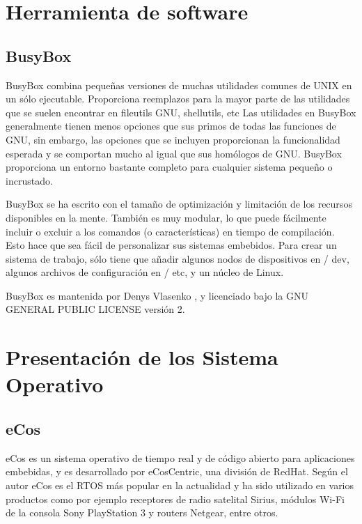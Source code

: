 	\section{Herramienta de software }	
 	
			\subsection{BusyBox}	
			 
BusyBox combina pequeñas versiones de muchas utilidades comunes de UNIX en un sólo ejecutable. Proporciona reemplazos para la mayor parte de las utilidades que se suelen encontrar en fileutils GNU, shellutils, etc Las utilidades en BusyBox generalmente tienen menos opciones que sus primos de todas las funciones de GNU, sin embargo, las opciones que se incluyen proporcionan la funcionalidad esperada y se comportan mucho al igual que sus homólogos de GNU. BusyBox proporciona un entorno bastante completo para cualquier sistema pequeño o incrustado.

BusyBox se ha escrito con el tamaño de optimización y limitación de los recursos disponibles en la mente. También es muy modular, lo que puede fácilmente incluir o excluir a los comandos (o características) en tiempo de compilación. Esto hace que sea fácil de personalizar sus sistemas embebidos. Para crear un sistema de trabajo, sólo tiene que añadir algunos nodos de dispositivos en / dev, algunos archivos de configuración en / etc, y un núcleo de Linux.

BusyBox es mantenida por Denys Vlasenko , y licenciado bajo la GNU GENERAL PUBLIC LICENSE versión 2.

		\section{Presentación de los Sistema Operativo}
 		
			 	\subsection{eCos}

eCos \cite{Etiqueta35} es un sistema operativo de tiempo real y de código abierto para aplicaciones embebidas, y es desarrollado por eCosCentric, una división de RedHat. Según el autor eCos es el RTOS más popular en la actualidad y ha sido utilizado en varios productos como 
por ejemplo receptores de radio satelital Sirius, módulos Wi-Fi de la consola Sony PlayStation 3 
y routers Netgear, entre otros. 


